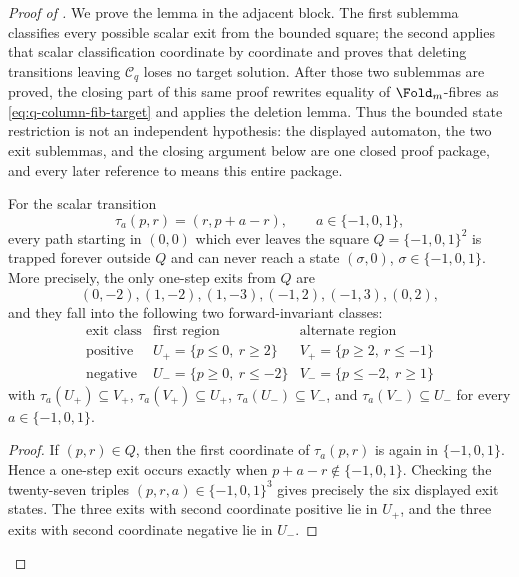 \begin{proof}[Proof of ]
We prove the lemma in the adjacent block.  The first sublemma classifies every
possible scalar exit from the bounded square; the second applies that scalar
classification coordinate by coordinate and proves that deleting transitions
leaving \(\mathcal C_q\) loses no target solution.  After those two sublemmas are
proved, the closing part of this same proof rewrites equality of
\(\Fold_m\)-fibres as \eqref{eq:q-column-fib-target} and applies the deletion
lemma.  Thus the bounded state restriction is not an independent hypothesis: the
displayed automaton, the two exit sublemmas, and the closing argument below are
one closed proof package, and every later reference to
 means this entire package.

\begin{lemma}
\label{lem:scalar-signed-fibonacci-exit-classification}
For the scalar transition
\[
  \tau_a(p,r)=(r,p+a-r),\qquad a\in\{-1,0,1\},
\]
every path starting in \((0,0)\) which ever leaves the square
\(Q=\{-1,0,1\}^2\) is trapped forever outside \(Q\) and can never reach a state
\((\sigma,0)\), \(\sigma\in\{-1,0,1\}\).  More precisely, the only one-step exits
from \(Q\) are
\[
  (0,-2),(1,-2),(1,-3),(-1,2),(-1,3),(0,2),
\]
and they fall into the following two forward-invariant classes:
\[
\begin{array}{c|c|c}
\text{exit class} & \text{first region} & \text{alternate region}\\ \hline
\text{positive} & U_+=\{p\le0,\ r\ge2\} & V_+=\{p\ge2,\ r\le-1\}\\
\text{negative} & U_-=\{p\ge0,\ r\le-2\} & V_-=\{p\le-2,\ r\ge1\}
\end{array}
\]
with \(\tau_a(U_+)\subseteq V_+\), \(\tau_a(V_+)\subseteq U_+\),
\(\tau_a(U_-)\subseteq V_-\), and \(\tau_a(V_-)\subseteq U_-\) for every
\(a\in\{-1,0,1\}\).
\end{lemma}

\begin{proof}
If \((p,r)\in Q\), then the first coordinate of \(\tau_a(p,r)\) is again in
\(\{-1,0,1\}\).  Hence a one-step exit occurs exactly when
\(p+a-r\notin\{-1,0,1\}\).  Checking the twenty-seven triples
\((p,r,a)\in\{-1,0,1\}^3\) gives precisely the six displayed exit states.  The
three exits with second coordinate positive lie in \(U_+\), and the three exits
with second coordinate negative lie in \(U_-\).


\end{proof}
\end{proof}
